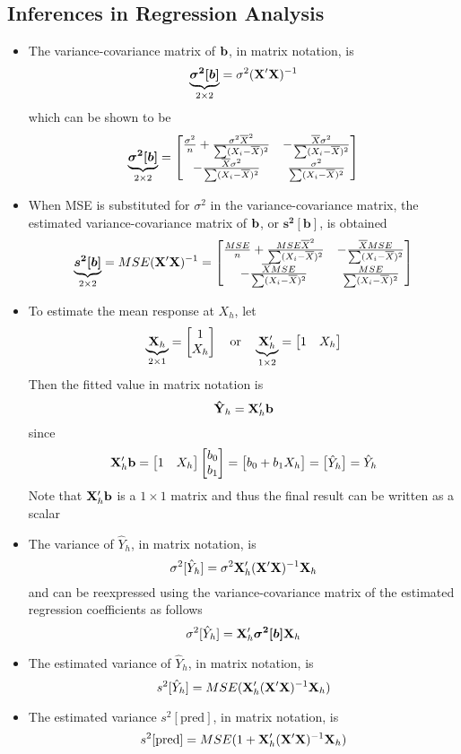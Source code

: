\subsection{Inferences in Regression Analysis}
\begin{itemize} 
\item The variance-covariance matrix of $\mathbf{b}$, in matrix notation, is $$ \underbrace{\bm{\sigma^2[b]}}_{2\times 2} = \sigma^2(\mathbf{X}'\mathbf{X})^{-1} $$ which can be shown to be 
$$ \underbrace{\bm{\sigma^2[b]}}_{2 \times 2} = \begin{bmatrix}  \frac{\sigma^2}{n} + \frac{\sigma^2 \overline{X}^2}{\sum (X_i - \overline{X})^2} & -\frac{\overline{X}\sigma^2}{\sum (X_i - \overline{X})^2} \\ -\frac{\overline{X} \sigma^2}{\sum (X_i - \overline{X})^2} & \frac{\sigma^2}{\sum (X_i - \overline{X})^2}  \end{bmatrix} $$ 
\item When MSE is substituted for $\sigma^2$ in the variance-covariance matrix, the estimated variance-covariance matrix of $\mathbf{b}$, or $\bm{s^2[b]}$, is obtained 
$$ \underbrace{\bm{s^2[b]}}_{2 \times 2} = MSE(\mathbf{X}'\mathbf{X})^{-1} = \begin{bmatrix}  \frac{MSE}{n} + \frac{MSE \overline{X}^2}{\sum (X_i - \overline{X})^2} & -\frac{\overline{X}MSE}{\sum (X_i - \overline{X})^2} \\ -\frac{\overline{X} MSE}{\sum (X_i - \overline{X})^2} & \frac{MSE}{\sum (X_i - \overline{X})^2}  \end{bmatrix}  $$ 
\item To estimate the mean response at $X_h$, let $$ \underbrace{\mathbf{X}_h}_{2 \times 1} = \begin{bmatrix} 1 \\ X_h \end{bmatrix} ~~~ \text{or} ~~~ \underbrace{\mathbf{X}'_h}_{1 \times 2} = \begin{bmatrix} 1 & X_h \end{bmatrix} $$ 
Then the fitted value in matrix notation is $$ \mathbf{\hat{Y}}_h = \mathbf{X}'_h\mathbf{b} $$ since $$ \mathbf{X}'_h\mathbf{b} = \begin{bmatrix} 1 & X_h \end{bmatrix}\begin{bmatrix} b_0 \\ b_1 \end{bmatrix} = \begin{bmatrix} b_0 + b_1X_h \end{bmatrix} = \begin{bmatrix} \hat{Y}_h \end{bmatrix} = \hat{Y}_h $$ 
Note that $\mathbf{X}'_h\mathbf{b}$ is a $1 \times 1$ matrix and thus the final result can be written as a scalar 
\item The variance of $\hat{Y}_h$, in matrix notation, is $$ \sigma^2[\hat{Y}_h] = \sigma^2\mathbf{X}'_h(\mathbf{X}'\mathbf{X})^{-1}\mathbf{X}_h $$ and can be reexpressed using the variance-covariance matrix of the estimated regression coefficients as follows $$ \sigma^2[\hat{Y}_h] = \mathbf{X}'_h\bm{\sigma^2[b]}\mathbf{X}_h $$ 
\item The estimated variance of $\hat{Y}_h$, in matrix notation, is $$ s^2[\hat{Y}_h] = MSE(\mathbf{X}'_h(\mathbf{X}'\mathbf{X})^{-1}\mathbf{X}_h) $$ 
\item The estimated variance $s^2[\text{pred}]$, in matrix notation, is $$ s^2[\text{pred}] = MSE(1 + \mathbf{X}'_h(\mathbf{X}'\mathbf{X})^{-1}\mathbf{X}_h) $$ 
\end{itemize} 

